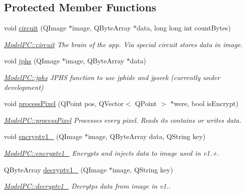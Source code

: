 \subsection*{Protected Member Functions}
\begin{DoxyCompactItemize}
\item 
void \hyperlink{class_model_p_c_a1d0091062a0c836b283ec2f67411623b}{circuit} (Q\-Image $\ast$image, Q\-Byte\-Array $\ast$data, long long int count\-Bytes)
\begin{DoxyCompactList}\small\item\em \hyperlink{class_model_p_c_a1d0091062a0c836b283ec2f67411623b}{Model\-P\-C\-::circuit} The brain of the app. Via special circuit stores data in image. \end{DoxyCompactList}\item 
void \hyperlink{class_model_p_c_a8bee0255c09449868c7e6097afaaf0cd}{jphs} (Q\-Image $\ast$image, Q\-Byte\-Array $\ast$data)
\begin{DoxyCompactList}\small\item\em \hyperlink{class_model_p_c_a8bee0255c09449868c7e6097afaaf0cd}{Model\-P\-C\-::jphs} J\-P\-H\-S function to use jphide and jpseek (currently under development) \end{DoxyCompactList}\item 
void \hyperlink{class_model_p_c_a1171f9fe1550133dc9053a46b4e5bcfd}{process\-Pixel} (Q\-Point pos, Q\-Vector$<$ Q\-Point $>$ $\ast$were, bool is\-Encrypt)
\begin{DoxyCompactList}\small\item\em \hyperlink{class_model_p_c_a1171f9fe1550133dc9053a46b4e5bcfd}{Model\-P\-C\-::process\-Pixel} Processes every pixel. Reads its contains or writes data. \end{DoxyCompactList}\item 
void \hyperlink{class_model_p_c_a4daefc3fb87a1f19172b9b20c987eb12}{encryptv1\-\_} (Q\-Image $\ast$image, Q\-Byte\-Array data, Q\-String key)
\begin{DoxyCompactList}\small\item\em \hyperlink{class_model_p_c_a4daefc3fb87a1f19172b9b20c987eb12}{Model\-P\-C\-::encryptv1\-\_} Encrypts and injects data to image used in v1.+. \end{DoxyCompactList}\item 
Q\-Byte\-Array \hyperlink{class_model_p_c_a4fe70ebbedfaf31d45a35f82d0f06caa}{decryptv1\-\_} (Q\-Image $\ast$image, Q\-String key)
\begin{DoxyCompactList}\small\item\em \hyperlink{class_model_p_c_a4fe70ebbedfaf31d45a35f82d0f06caa}{Model\-P\-C\-::decryptv1\-\_} Decrytps data from image in v1.. \end{DoxyCompactList}\item 

\end{DoxyCompactItemize}
